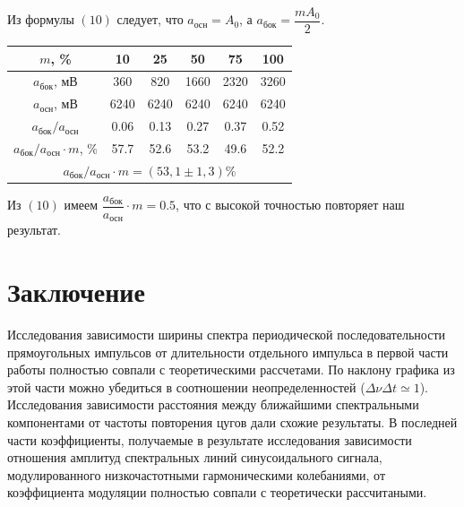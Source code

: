     \begin{figure}[H]
    \centering
        			
\end{figure}\n
Из формулы $(10)$ следует, что $a_{\text{осн}} = A_0$, а $a_{\text{бок}} = \dfrac{mA_0}{2}$.
\begin{center}
\begin{tabular}{|c|c|c|c|c|c|}
\hline
$m$, \% & 10 & 25 & 50 & 75 & 100 \\ \hline
$a_{\text{бок}}$, мВ & 360 & 820 & 1660 & 2320 & 3260 \\ \hline
$a_{\text{осн}}$, мВ & 6240 & 6240 & 6240 & 6240 & 6240 \\ \hline
$a_{\text{бок}}/a_{\text{осн}}$ & 0.06 & 0.13 & 0.27 & 0.37 & 0.52 \\ \hline
$a_{\text{бок}}/a_{\text{осн}} \cdot m$, \% & 57.7 & 52.6 & 53.2 & 49.6 & 52.2 \\ \hline
\multicolumn{6}{|c|}{$a_{\text{бок}}/a_{\text{осн}} \cdot m = (53,1 \pm 1,3)$\%} \\ \hline
\end{tabular}
\end{center}
Из $(10)$ имеем $\dfrac{a_{\text{бок}}}{a_{\text{осн}}} \cdot m = 0.5$, что с высокой точностью повторяет наш результат.
\n
\section*{Заключение}
Исследования зависимости ширины спектра периодической последовательности прямоугольных импульсов от длительности отдельного импульса в первой части работы полностью совпали с теоретическими рассчетами. По наклону графика из этой части можно убедиться в соотношении неопределенностей ($\Delta \nu \Delta t \simeq 1$).
\n\n
Исследования зависимости расстояния между ближайшими спектральными компонентами от частоты повторения цугов дали схожие результаты. 
\n\n
В последней части коэффициенты, получаемые в результате исследования зависимости отношения амплитуд спектральных линий синусоидального сигнала, модулированного низкочастотными гармоническими колебаниями, от коэффициента модуляции полностью совпали с теоретически рассчитаными. 


